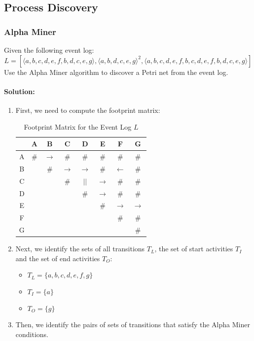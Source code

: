\subsection{Process Discovery}
\subsubsection{Alpha Miner}
Given the following event log:
\[L = \left[ \langle a,b,c,d,e,f,b,d,c,e,g \rangle, \langle a,b,d,c,e,g \rangle^2, \langle a,b,c,d,e,f,b,c,d,e,f,b,d,c,e,g \rangle\right]\]
Use the Alpha Miner algorithm to discover a Petri net from the event log.
\paragraph{Solution:}
\begin{enumerate}
    \item First, we need to compute the footprint matrix:
    \begin{table}[H]
    \centering
    \begin{tabular}{c|ccccccc}
        & A & B & C & D & E & F & G \\
        \hline
        A & $\#$ & $\rightarrow$ & $\#$ & $\#$ & $\#$ & $\#$ & $\#$ \\
        B &  & $\#$ & $\rightarrow$ & $\rightarrow$ & $\#$ & $\leftarrow$ & $\#$ \\
        C &  &  & $\#$ & $||$ & $\rightarrow$ & $\#$ & $\#$ \\
        D &  &  &  & $\#$ & $\rightarrow$ & $\#$ & $\#$ \\
        E &  &  &  &  & $\#$ & $\rightarrow$ & $\rightarrow$ \\
        F &  &  &  &  &  & $\#$ & $\#$ \\
        G &  &  &  &  &  &  & $\#$ \\
    \end{tabular}
    \caption{Footprint Matrix for the Event Log \(L\)}
\end{table}
    \item Next, we identify the sets of all transitions $T_L$, the set of start activities $T_I$ and the set of end activities $T_O$:
    \begin{itemize}
        \item $T_L = \{a,b,c,d,e,f,g\}$
        \item $T_I = \{a\}$
        \item $T_O = \{g\}$
    \end{itemize}
    \item Then, we identify the pairs of sets of transitions that satisfy the Alpha Miner conditions.

\end{enumerate}
